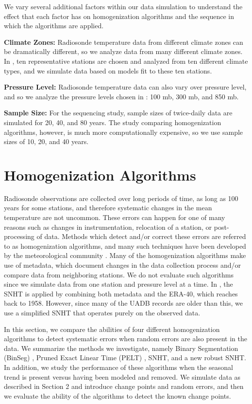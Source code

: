 \documentclass[12pt]{article}
\begin{document}
\begin{doublespacing}
We vary several additional factors within our data simulation to understand the effect that each factor has on homogenization algorithms and the sequence in which the algorithms are applied.

\textbf{Climate Zones:} Radiosonde temperature data from different climate zones can be dramatically different,  so we analyze data from many different climate zones.  In \cite{bell14}, ten representative stations are chosen and analyzed from ten different climate types, and we simulate data based on models fit to these ten stations.

\textbf{Pressure Level:} Radiosonde temperature data can also vary  over pressure level, and so we analyze the pressure levels chosen in \cite{bell14}: 100 mb, 300 mb, and 850 mb.

\textbf{Sample Size:}  For the sequencing study, sample sizes of twice-daily data are simulated for 20, 40, and 80 years.  The study comparing homogenization algorithms, however, is much more computationally expensive, so we use sample sizes of 10, 20, and 40 years.

\section{Homogenization Algorithms}

Radiosonde observations are collected over long periods of time, as long as 100 years for some stations, and therefore systematic changes in the mean temperature are not uncommon.  These errors can happen for one of many reasons such as changes in instrumentation, relocation of a station, or post-processing of data.  Methods which detect and/or correct these errors are referred to as homogenization algorithms, and many such techniques have been developed by the meteorological community \cite{alexandersson86, domonkos13, gruber08, haimberger07, lanzante03, li14, lu10, venema12}.  Many of the homogenization algorithms make use of metadata, which document changes in the data collection process and/or compare data from neighboring stations.  We do not evaluate such algorithms since we simulate data from one station and pressure level at a time.  In \cite{haimberger07,haimberger12}, the SNHT is applied by combining both metadata and the ERA-40, which reaches back to 1958.  However, since many of the UADB records are older than this,  we use a simplified SNHT that operates purely on the observed data.

In this section, we compare the abilities of four different homogenization algorithms to detect systematic errors when random errors are also present in the data.  We summarize the methods we investigate, namely Binary Segmentation (BinSeg) \cite{scott74}, Pruned Exact Linear Time (PELT) \cite{killick12}, SNHT, and a new robust SNHT.  In addition, we study the performance of these algorithms when the seasonal trend is present versus having been modeled and removed.  We simulate data as described in Section 2 and  introduce change points and random errors, and then we evaluate the ability of the algorithms to detect the known change points. 


\end{doublespacing}
\end{document}
